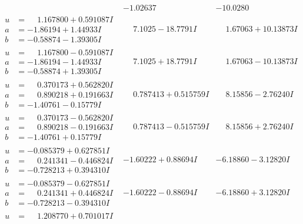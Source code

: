 \documentclass[1p]{elsarticle_modified}
\theoremstyle{definition}
\begin{document}
$$\begin{array}{c|c|c}
 & -1.02637\phantom{ +0.000000I} & -10.0280\phantom{ +0.000000I} \\ \hline\begin{aligned}
u &= \phantom{-}1.167800 + 0.591087 I \\
a &= -1.86194 + 1.44933 I \\
b &= -0.58874 - 1.39305 I\end{aligned}
 & \phantom{-}7.1025 - 18.7791 I & \phantom{-}1.67063 + 10.13873 I \\ \hline\begin{aligned}
u &= \phantom{-}1.167800 - 0.591087 I \\
a &= -1.86194 - 1.44933 I \\
b &= -0.58874 + 1.39305 I\end{aligned}
 & \phantom{-}7.1025 + 18.7791 I & \phantom{-}1.67063 - 10.13873 I \\ \hline\begin{aligned}
u &= \phantom{-}0.370173 + 0.562820 I \\
a &= \phantom{-}0.890218 + 0.191663 I \\
b &= -1.40761 - 0.15779 I\end{aligned}
 & \phantom{-}0.787413 + 0.515759 I & \phantom{-}8.15856 - 2.76240 I \\ \hline\begin{aligned}
u &= \phantom{-}0.370173 - 0.562820 I \\
a &= \phantom{-}0.890218 - 0.191663 I \\
b &= -1.40761 + 0.15779 I\end{aligned}
 & \phantom{-}0.787413 - 0.515759 I & \phantom{-}8.15856 + 2.76240 I \\ \hline\begin{aligned}
u &= -0.085379 + 0.627851 I \\
a &= \phantom{-}0.241341 - 0.446824 I \\
b &= -0.728213 + 0.394310 I\end{aligned}
 & -1.60222 + 0.88694 I & -6.18860 - 3.12820 I \\ \hline\begin{aligned}
u &= -0.085379 - 0.627851 I \\
a &= \phantom{-}0.241341 + 0.446824 I \\
b &= -0.728213 - 0.394310 I\end{aligned}
 & -1.60222 - 0.88694 I & -6.18860 + 3.12820 I \\ \hline\begin{aligned}
u &= \phantom{-}1.208770 + 0.701017 I \\

\end{aligned}
\end{array}$$
\end{document}
